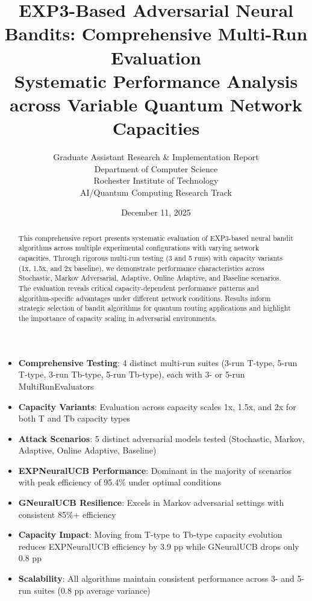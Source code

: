 \documentclass[11pt,a4paper]{article}
\title{\textbf{EXP3-Based Adversarial Neural Bandits: Comprehensive Multi-Run Evaluation}\\ 
\large{Systematic Performance Analysis across Variable Quantum Network Capacities}}
\author{Graduate Assistant Research \& Implementation Report\\ 
Department of Computer Science \\ 
Rochester Institute of Technology \\ 
AI/Quantum Computing Research Track}
\date{December 11, 2025}
\newcommand{\performance}[1]{\textcolor{performancecolor}{\textbf{#1}}}
\newcommand{\critical}[1]{\textcolor{criticalcolor}{\textbf{#1}}}
\newcommand{\success}[1]{\textcolor{successcolor}{\textbf{#1}}}
\begin{document}
\maketitle

\begin{abstract}
This comprehensive report presents systematic evaluation of EXP3-based neural bandit algorithms across multiple experimental configurations with varying network capacities. Through rigorous multi-run testing (3 and 5 runs) with capacity variants (1x, 1.5x, and 2x baseline), we demonstrate performance characteristics across Stochastic, Markov Adversarial, Adaptive, Online Adaptive, and Baseline scenarios. The evaluation reveals critical capacity-dependent performance patterns and algorithm-specific advantages under different network conditions. Results inform strategic selection of bandit algorithms for quantum routing applications and highlight the importance of capacity scaling in adversarial environments.
\end{abstract}

\newpage

{\small\tableofcontents}

\newpage

\begin{tcolorbox}[colback=highlightcolor!30,colframe=performancecolor,title=\textbf{Executive Summary: Multi-Run Evaluation Results}]
\begin{itemize}
\item \performance{Comprehensive Testing}: 4 distinct multi-run suites (3-run T-type, 5-run T-type, 3-run Tb-type, 5-run Tb-type), each with 3- or 5-run MultiRunEvaluators
\item \performance{Capacity Variants}: Evaluation across capacity scales 1x, 1.5x, and 2x for both T and Tb capacity types
\item \performance{Attack Scenarios}: 5 distinct adversarial models tested (Stochastic, Markov, Adaptive, Online Adaptive, Baseline)
\item \success{EXPNeuralUCB Performance}: Dominant in the majority of scenarios with peak efficiency of 95.4\% under optimal conditions
\item \success{GNeuralUCB Resilience}: Excels in Markov adversarial settings with consistent 85\%+ efficiency
\item \critical{Capacity Impact}: Moving from T-type to Tb-type capacity evolution reduces EXPNeuralUCB efficiency by 3.9 pp while GNeuralUCB drops only 0.8 pp
\item \success{Scalability}: All algorithms maintain consistent performance across 3- and 5-run suites (0.8 pp average variance)
\end{itemize}
\end{tcolorbox}
\end{document}
